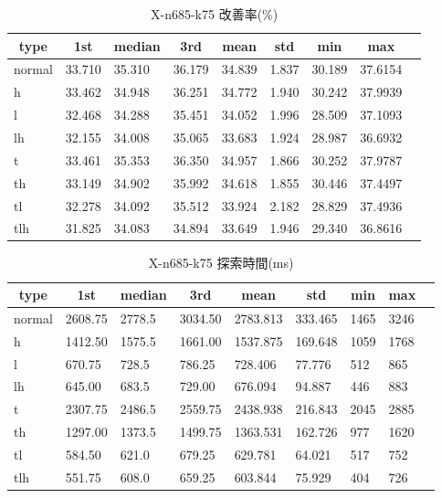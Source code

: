 \begin{table}[htbp]
    \caption{X-n685-k75 改善率(\%)}
    \begin{tabular}{|l|l|l|l|l|l|l|l|l|}\hline
    \multicolumn{1}{|c|}{\textbf{type}}
    &\multicolumn{1}{|c|}{\textbf{1st}}
    &\multicolumn{1}{c|}{\textbf{median}}
    &\multicolumn{1}{c|}{\textbf{3rd}}
    &\multicolumn{1}{c|}{\textbf{mean}}
    &\multicolumn{1}{c|}{\textbf{std}}
    &\multicolumn{1}{c|}{\textbf{min}}
    &\multicolumn{1}{c|}{\textbf{max}}\\\hline
	normal & 33.710 & 35.310 & 36.179 & 34.839 & 1.837 & 30.189 & 37.6154\\\hline
	h & 33.462 & 34.948 & 36.251 & 34.772 & 1.940 & 30.242 & 37.9939\\\hline
	l & 32.468 & 34.288 & 35.451 & 34.052 & 1.996 & 28.509 & 37.1093\\\hline
	lh & 32.155 & 34.008 & 35.065 & 33.683 & 1.924 & 28.987 & 36.6932\\\hline
	t & 33.461 & 35.353 & 36.350 & 34.957 & 1.866 & 30.252 & 37.9787\\\hline
	th & 33.149 & 34.902 & 35.992 & 34.618 & 1.855 & 30.446 & 37.4497\\\hline
	tl & 32.278 & 34.092 & 35.512 & 33.924 & 2.182 & 28.829 & 37.4936\\\hline
	tlh & 31.825 & 34.083 & 34.894 & 33.649 & 1.946 & 29.340 & 36.8616\\\hline
	\end{tabular}
\end{table}
\begin{table}[htbp]
    \caption{X-n685-k75 探索時間(ms)}
    \begin{tabular}{|l|l|l|l|l|l|l|l|l|}\hline
    \multicolumn{1}{|c|}{\textbf{type}}
    &\multicolumn{1}{|c|}{\textbf{1st}}
    &\multicolumn{1}{c|}{\textbf{median}}
    &\multicolumn{1}{c|}{\textbf{3rd}}
    &\multicolumn{1}{c|}{\textbf{mean}}
    &\multicolumn{1}{c|}{\textbf{std}}
    &\multicolumn{1}{c|}{\textbf{min}}
    &\multicolumn{1}{c|}{\textbf{max}}\\\hline
	normal & 2608.75 & 2778.5 & 3034.50 & 2783.813 & 333.465 & 1465 & 3246\\\hline
	h & 1412.50 & 1575.5 & 1661.00 & 1537.875 & 169.648 & 1059 & 1768\\\hline
	l & 670.75 & 728.5 & 786.25 & 728.406 & 77.776 & 512 & 865\\\hline
	lh & 645.00 & 683.5 & 729.00 & 676.094 & 94.887 & 446 & 883\\\hline
	t & 2307.75 & 2486.5 & 2559.75 & 2438.938 & 216.843 & 2045 & 2885\\\hline
	th & 1297.00 & 1373.5 & 1499.75 & 1363.531 & 162.726 & 977 & 1620\\\hline
	tl & 584.50 & 621.0 & 679.25 & 629.781 & 64.021 & 517 & 752\\\hline
	tlh & 551.75 & 608.0 & 659.25 & 603.844 & 75.929 & 404 & 726\\\hline
	\end{tabular}
\end{table}
